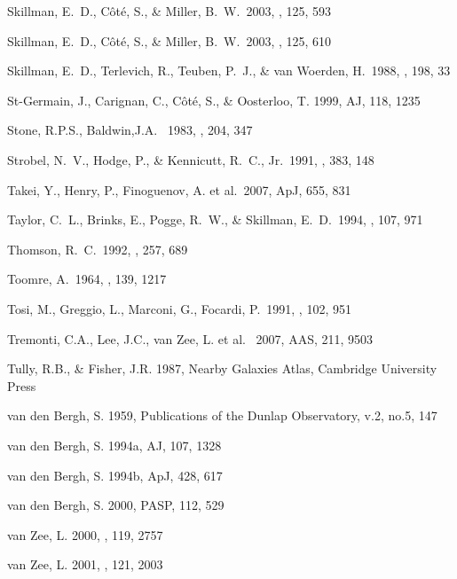 \documentclass[12pt,preprint]{aastex}
\begin{document}
\begin{thebibliography}{}
Skillman, E.~D., C{\^o}t{\'e}, S., \& Miller, B.~W.\ 2003, \aj, 125, 593

Skillman, E.~D., C{\^o}t{\'e}, S., \& Miller, B.~W.\ 2003, \aj, 125, 610 

Skillman, E.~D., Terlevich, R., Teuben, P.~J., \& van Woerden, H.\ 1988, \aap, 198, 33 

St-Germain, J., Carignan, C., C\^ot\'e, S., \& Oosterloo, T. 1999, AJ, 118, 1235

Stone, R.P.S., Baldwin,J.A. \ 1983, \mnras, 204, 347

Strobel, N.~V., Hodge, P., \& Kennicutt, R.~C., Jr.\ 1991, \apj, 383, 148 

Takei, Y., Henry, P., Finoguenov, A. et al.\ 2007, ApJ, 655, 831 

Taylor, C.~L., Brinks, E., Pogge, R.~W., \& Skillman, E.~D.\ 1994, \aj, 107, 971 

Thomson, R.~C.\ 1992, \mnras, 257, 689 

Toomre, A.\ 1964, \apj, 139, 1217 

Tosi, M., Greggio, L., Marconi, G., Focardi, P.\ 1991, \aj, 102, 951 

Tremonti, C.A., Lee, J.C., van Zee, L. et al. \ 2007, AAS, 211, 9503

Tully, R.B., \& Fisher, J.R. 1987, Nearby Galaxies Atlas, Cambridge
University Press
 
van den Bergh, S. 1959, Publications of the Dunlap Observatory, v.2, no.5, 147

van den Bergh, S. 1994a, AJ, 107, 1328

van den Bergh, S. 1994b, ApJ, 428, 617

van den Bergh, S. 2000, PASP, 112, 529

van Zee, L. 2000, \aj , 119, 2757

van Zee, L. 2001, \aj , 121, 2003


\end{thebibliography}
\end{document}
